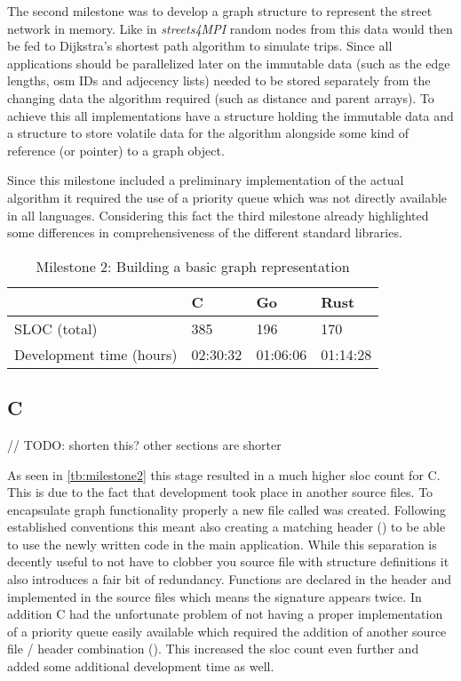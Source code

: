 The second milestone was to develop a graph structure to represent the street network in memory. Like in \textit{streets4MPI} random nodes from this data would then be fed to Dijkstra's shortest path algorithm to simulate trips. Since all applications should be parallelized later on the immutable data (such as the edge lengths, \gls{osm} IDs and adjecency lists) needed to be stored separately from the changing data the algorithm required (such as distance and parent arrays). To achieve this all implementations have a  structure holding the immutable data and a  structure to store volatile data for the algorithm alongside some kind of reference (or pointer) to a graph object.

Since this milestone included a preliminary implementation of the actual algorithm it required the use of a priority queue which was not directly available in all languages. Considering this fact the third milestone already highlighted some differences in comprehensiveness of the different standard libraries.

\begin{table}[htb]
    \centering
    \begin{tabular}{llll}
        \toprule
            & C
            & Go
            & Rust \\
        \midrule

        SLOC (total)
            & 385
            & 196
            & 170 \\

        Development time (hours)
            & 02:30:32
            & 01:06:06
            & 01:14:28 \\
        \bottomrule
    \end{tabular}
    \caption{Milestone 2: Building a basic graph representation}
    \label{tb:milestone2}
\end{table}

\subsection{C}
\label{subsec:Implementation::Graph_Representation::C}
// TODO: shorten this? other sections are shorter

As seen in \autoref{tb:milestone2} this stage resulted in a much higher \gls{sloc} count for C. This is due to the fact that development took place in another source files. To encapsulate graph functionality properly a new file called  was created. Following established conventions this meant also creating a matching header () to be able to use the newly written code in the main application. While this separation is decently useful to not have to clobber you source file with structure definitions it also introduces a fair bit of redundancy. Functions are declared in the header and implemented in the source files which means the signature appears twice. In addition C had the unfortunate problem of not having a proper implementation of a priority queue easily available which required the addition of another source file / header combination (). This increased the \gls{sloc} count even further and added some additional development time as well.

